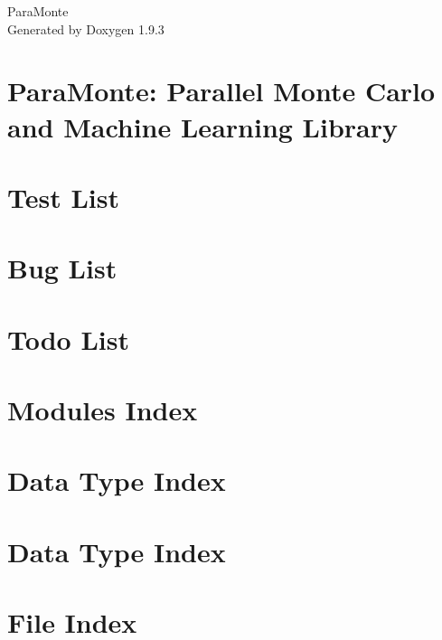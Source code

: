 \documentclass[twoside]{book}
\newcommand{\+}{\discretionary{\mbox{\scriptsize$\hookleftarrow$}}{}{}}
\newcommand{\clearemptydoublepage}{%
    \newpage{\pagestyle{empty}\cleardoublepage}%
  }
\begin{document}
  \raggedbottom
    \hypersetup{pageanchor=false,
                bookmarksnumbered=true,
                pdfencoding=unicode
               }
  \begin{titlepage}
  \vspace*{7cm}
  \begin{center}%
  {\Large Para\+Monte}\\
  \vspace*{1cm}
  {\large Generated by Doxygen 1.9.3}\\
  \end{center}
  \end{titlepage}
  \clearemptydoublepage
  \tableofcontents
  \clearemptydoublepage
  \hypersetup{pageanchor=true}
\chapter{Para\+Monte\+: Parallel Monte Carlo and Machine Learning Library}
\label{index}\hypertarget{index}{}
\chapter{Test List}
\label{test}

\chapter{Bug List}
\label{bug}

\chapter{Todo List}
\label{todo}

\chapter{Modules Index}

\chapter{Data Type Index}

\chapter{Data Type Index}

\chapter{File Index}

\end{document}
